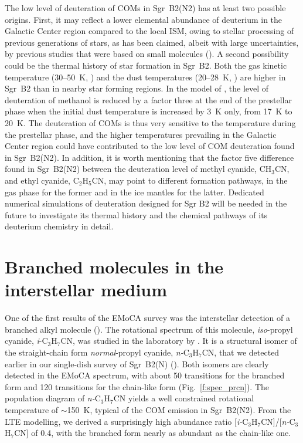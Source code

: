 \documentclass{iau}
\begin{document}
The low level of deuteration of COMs in Sgr~B2(N2) has at least two possible 
origins. First, it may reflect a lower elemental abundance of deuterium in the 
Galactic Center region compared to the local ISM, owing to stellar processing 
of previous generations of stars, as has been claimed, albeit with large 
uncertainties, by previous studies that were based on small molecules 
(\cite{Jacq99,Lubowich00,Polehampton02}). A second possibility could be the 
thermal history of star formation in Sgr~B2. Both the gas kinetic temperature 
(30--50~K, \cite{Ott14}) and the dust temperatures (20--28~K, \cite{Guzman15}) 
are higher in Sgr~B2 than in nearby star forming regions. In the model of 
\cite{Taquet14}, the level of deuteration of methanol is reduced by a factor 
three at the end of the prestellar phase when the initial dust temperature is 
increased by 3~K only, from 17~K to 20~K. The deuteration of COMs is thus very 
sensitive to the temperature during the prestellar phase, and the higher 
temperatures prevailing in the Galactic Center region could have contributed 
to the low level of COM deuteration found in Sgr~B2(N2). In addition, it is 
worth mentioning that the factor five difference found in Sgr~B2(N2) between 
the deuteration level of methyl cyanide, CH$_3$CN, and ethyl cyanide, 
C$_2$H$_5$CN, may point to different formation pathways, in the gas phase for 
the former and in the ice mantles for the latter. 
Dedicated numerical simulations of deuteration designed for Sgr B2 will be 
needed in the future to investigate its thermal history and the chemical 
pathways of its deuterium chemistry in detail.

\section{Branched molecules in the interstellar medium}
\label{s:iprcn}

One of the first results of the EMoCA survey was the interstellar detection of 
a branched alkyl molecule (\cite{Belloche14}). The rotational spectrum of this 
molecule, \textit{iso}-propyl cyanide, \textit{i}-C$_3$H$_7$CN, was studied in 
the laboratory by \cite{Mueller11}. It is a structural isomer of the 
straight-chain form \textit{normal}-propyl cyanide, \textit{n-}C$_3$H$_7$CN,
that we detected earlier in our single-dish survey of Sgr~B2(N) 
(\cite{Belloche09}). Both isomers are clearly detected in the EMoCA spectrum, 
with about 50 transitions for the branched form and 120 transitions for the
chain-like form (Fig.~\ref{f:spec_prcn}). The population diagram of 
\textit{n-}C$_3$H$_7$CN yields a well constrained rotational temperature
of $\sim$150~K, typical of the COM emission in Sgr~B2(N2). From the LTE
modelling, we derived a surprisingly high abundance ratio 
[\textit{i-}C$_3$H$_7$CN]/[\textit{n-}C$_3$H$_7$CN] of 0.4, with the branched
form nearly as abundant as the chain-like one.
\end{document}
